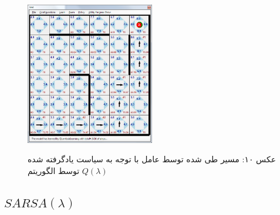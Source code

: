 \documentclass[10pt,a4paper]{article}
\begin{document}
\begin{figure}[H]
    \centering
    \includegraphics[width=0.5\textwidth]{qlambda-exec}
    \begin{center}
    \textarabic{عکس ۱۰: مسیر طی شده توسط عامل با توجه به سیاست یادگرفته شده توسط الگوریتم $Q(\lambda)$ }
    \end{center}
\end{figure}
\subsection{$SARSA(\lambda)$}
\end{document}
